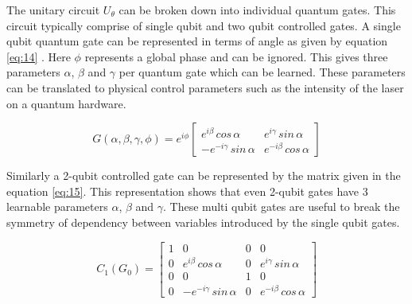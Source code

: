 \documentclass[english,a4paper,11pt,oneside,onecolumn]{book}
\begin{document}
The unitary circuit \(U_\theta\) can be broken down into individual quantum gates. This circuit typically comprise of single qubit and two qubit controlled gates. A single qubit quantum gate can be represented in terms of angle as given by equation \ref{eq:14} \cite{schuld_2020_circuitcentric}. Here \(\phi\) represents a global phase and can be ignored. This gives three parameters \(\alpha\), \(\beta\) and \(\gamma\) per quantum gate which can be learned. These parameters can be translated to physical control parameters such as the intensity of the laser on a quantum hardware.

\begin{equation}\label{eq:14}
G(\alpha, \beta, \gamma, \phi) = e^{i\phi}
\begin{bmatrix}
e^{i\beta}\hspace{2pt}cos\hspace{2pt}\alpha & e^{i\gamma}\hspace{2pt}sin\hspace{2pt}\alpha\\
-e^{-i\gamma}\hspace{2pt}sin\hspace{2pt}\alpha & e^{-i\beta}\hspace{2pt}cos\hspace{2pt}\alpha
\end{bmatrix}
\end{equation}

Similarly a 2-qubit controlled gate can be represented by the matrix given in the equation \ref{eq:15}. This representation shows that even 2-qubit gates have 3 learnable parameters \(\alpha\), \(\beta\) and \(\gamma\). These multi qubit gates are useful to break the symmetry of dependency between variables introduced by the single qubit gates. 

\begin{equation}\label{eq:15}
C_1(G_0) = \begin{bmatrix}
1 & 0 & 0 & 0\\
0 & e^{i\beta}\hspace{2pt}cos\hspace{2pt}\alpha & 0 & e^{i\gamma}\hspace{2pt}sin\hspace{2pt}\alpha\\
0 & 0 & 1 & 0\\
0 & -e^{-i\gamma}\hspace{2pt}sin\hspace{2pt}\alpha & 0 & e^{-i\beta}\hspace{2pt}cos\hspace{2pt}\alpha
\end{bmatrix}
\end{equation}
\end{document}
